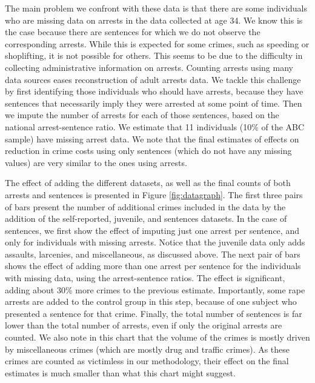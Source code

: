 \noindent The main problem we confront with these data is that there are some individuals who are missing data on arrests in the data collected at age 34. We know this is the case because there are sentences for which we do not observe the corresponding arrests. While this is expected for some crimes, such as speeding or shoplifting, it is not possible for others. This seems to be due to the difficulty in collecting administrative information on arrests. Counting arrests using many data sources eases  reconstruction of adult arrests data. We tackle this challenge by first identifying those individuals who should have arrests, because they have sentences that necessarily imply they were arrested at some point of time. Then we impute the number of arrests for each of those sentences, based on the national arrest-sentence ratio. We estimate that 11 individuals (10\% of the ABC sample) have missing arrest data. We note that the final estimates of effects on reduction in crime costs using only sentences (which do not have any missing values) are very similar to the ones using arrests. 

\noindent The effect of adding the different datasets, as well as the final counts of both arrests and sentences is presented in Figure \ref{fig:datagraph}. The first three pairs of bars present the number of additional crimes included in the data by the addition of the self-reported, juvenile, and sentences datasets. In the case of sentences, we first show the effect of imputing just one arrest per sentence, and only for individuals with missing arrests. Notice that the juvenile data only adds assaults, larcenies, and miscellaneous, as discussed above. The next pair of bars shows the effect of adding more than one arrest per sentence for the individuals with missing data, using the arrest-sentence ratios. The effect is significant, adding about 30\% more crimes to the previous estimate. Importantly, some rape arrests are added to the control group in this step, because of one subject who presented a sentence for that crime. Finally, the total number of sentences is far lower than the total number of arrests, even if only the original arrests are counted. We also note in this chart that the volume of the crimes is mostly driven by miscellaneous crimes (which are mostly drug and traffic crimes). As these crimes are counted as victimless in our methodology, their effect on the final estimates is much smaller than what this chart might suggest. 

